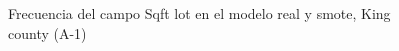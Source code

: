 \begin{figure}[H]
    \centering
    
    \caption{Frecuencia del campo Sqft lot en el modelo real y smote, King county (A-1)}
    \label{frecuency-smote-sqft lot}
\end{figure}